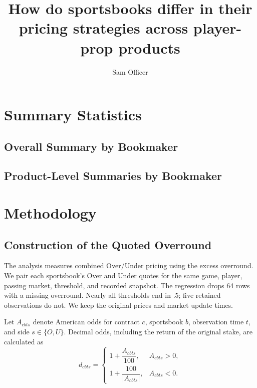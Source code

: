 \documentclass[11pt]{article}
\title{How do sportsbooks differ in their pricing strategies across player-prop products} %
\author{Sam Officer}
\date{} %
\begin{document}
\raggedbottom

\section{Summary Statistics}

\subsection{Overall Summary by Bookmaker}



\subsection{Product-Level Summaries by Bookmaker}













\clearpage
\section{Methodology}

\subsection{Construction of the Quoted Overround}

The analysis measures combined Over/Under pricing using the excess
overround. We pair each sportsbook's Over and Under quotes for the
same game, player, passing market, threshold, and recorded snapshot.
The regression drops 64 rows with a missing overround. Nearly all
thresholds end in .5; five retained observations do not. We keep the
original prices and market update times.

Let $A_{cbts}$ denote American odds for contract $c$, sportsbook $b$,
observation time $t$, and side $s \in \{O,U\}$. Decimal odds, including
the return of the original stake, are calculated as
\begin{equation}
d_{cbts} =
\begin{cases}
1 + \dfrac{A_{cbts}}{100}, & A_{cbts}>0, \\[6pt]
1 + \dfrac{100}{|A_{cbts}|}, & A_{cbts}<0.
\end{cases}
\end{equation}
\end{document}
